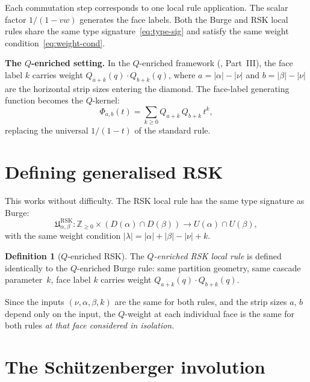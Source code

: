 \documentclass[11pt]{article}
\newcommand{\Z}{\mathbb{Z}}
\theoremstyle{plain}
\theoremstyle{definition}
\newtheorem{definition}[theorem]{Definition}
\begin{document}
Each commutation step corresponds to one local rule application.
The scalar factor $1/(1-vw)$ generates the face labels.  Both
the Burge and RSK local rules share the same type
signature~\eqref{eq:type-sig} and satisfy the same weight
condition~\eqref{eq:weight-cond}.

\medskip
\noindent\textbf{The $Q$-enriched setting.}
In the $Q$-enriched framework (\cite{ADJOINT}, Part~III), the
face label $k$ carries weight $Q_{a+k}(q) \cdot Q_{b+k}(q)$,
where $a = |\alpha| - |\nu|$ and $b = |\beta| - |\nu|$ are the
horizontal strip sizes entering the diamond.  The face-label
generating function becomes the $Q$-kernel:
\begin{equation}\label{eq:Phi}
  \Phi_{a,b}(t) = \sum_{k \geq 0} Q_{a+k}\, Q_{b+k}\, t^k,
\end{equation}
replacing the universal $1/(1-t)$ of the standard rule.


\section{Defining generalised RSK}
\label{sec:gen-RSK}

This works without difficulty.  The RSK local rule has the same
type signature as Burge:
\begin{equation}\label{eq:RSK-type}
  \mathfrak{U}^{\mathrm{RSK}}_{\alpha,\beta}\colon
  \Z_{\geq 0} \times (D(\alpha) \cap D(\beta))
  \to U(\alpha) \cap U(\beta),
\end{equation}
with the same weight condition
$|\lambda| = |\alpha| + |\beta| - |\nu| + k$.

\begin{definition}[$Q$-enriched RSK]
\label{def:Q-RSK}
The \emph{$Q$-enriched RSK local rule} is defined identically to
the $Q$-enriched Burge rule: same partition geometry, same cascade
parameter~$k$, face label $k$ carries weight
$Q_{a+k}(q) \cdot Q_{b+k}(q)$.
\end{definition}

Since the inputs $(\nu, \alpha, \beta, k)$ are the same for both
rules, and the strip sizes $a$, $b$ depend only on the input, the
$Q$-weight at each individual face is the same for both rules
\emph{at that face considered in isolation}.


\section{The Sch\"utzenberger involution}
\label{sec:schutzenberger}
\end{document}
